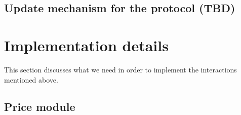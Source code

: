 \documentclass{article} %
\begin{document}
% 

\subsection{Update mechanism for the protocol (TBD)}

\section{Implementation details}

This section discusses what we need in order to implement the interactions
mentioned above.

\subsection{Price module}
\end{document}
